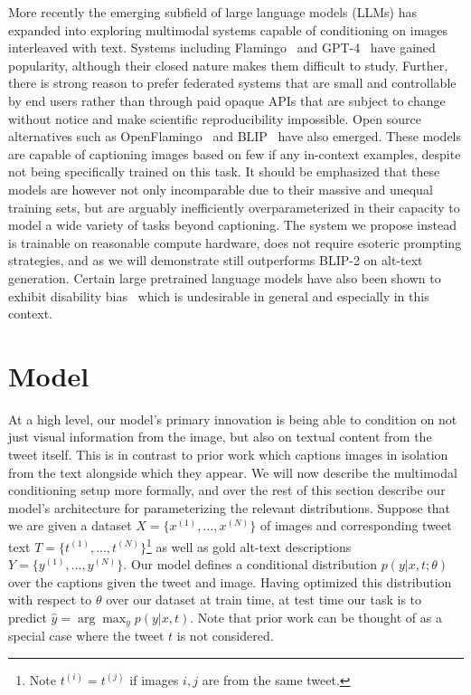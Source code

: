 \documentclass{article} %
\begin{document}
More recently the emerging subfield of large language models (LLMs) has expanded into exploring multimodal systems capable of conditioning on images interleaved with text.
Systems including Flamingo~\citep{flamingo} and GPT-4~\citep{gpt4} have gained popularity, although their closed nature makes them difficult to study.
Further, there is strong reason to prefer federated systems that are small and controllable by end users rather than through paid opaque APIs that are subject to change without notice and make scientific reproducibility impossible.
Open source alternatives such as OpenFlamingo~\citep{openflamingo} and BLIP~\citep{blip, blip2} have also emerged.
These models are capable of captioning images based on few if any in-context examples, despite not being specifically trained on this task.
It should be emphasized that these models are however not only incomparable due to their massive and unequal training sets, but are arguably inefficiently overparameterized in their capacity to model a wide variety of tasks beyond captioning.
The system we propose instead is trainable on reasonable compute hardware, does not require esoteric prompting strategies, and as we will demonstrate still outperforms BLIP-2 on alt-text generation.
Certain large pretrained language models have also been shown to exhibit disability bias~\citep{herold-etal-2022-applying} which is undesirable in general and especially in this context.

\section{Model}

At a high level, our model's primary innovation is being able to condition on not just visual information from the image, but also on textual content from the tweet itself.
This is in contrast to prior work which captions images in isolation from the text alongside which they appear.
We will now describe the multimodal conditioning setup more formally, and over the rest of this section describe our model's architecture for parameterizing the relevant distributions.
Suppose that we are given a dataset $X = \{x^{(1)}, ... , x^{(N)}\}$ of images and corresponding tweet text $T = \{t^{(1)}, ... , t^{(N)}\}$\footnote{Note $t^{(i)} = t^{(j)}$ if images $i,j$ are from the same tweet.} as well as gold alt-text descriptions $Y = \{y^{(1)}, ... , y^{(N)}\}$.
Our model defines a conditional distribution $p(y | x, t ; \theta)$ over the captions given the tweet and image.
Having optimized this distribution with respect to $\theta$ over our dataset at train time, at test time our task is to predict $\hat{y} = \arg \max_{y} p(y | x, t)$.
Note that prior work can be thought of as a special case where the tweet $t$ is not considered.
\end{document}

